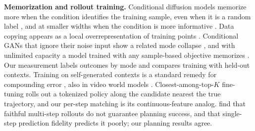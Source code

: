 \textbf{Memorization and rollout training.} Conditional diffusion models memorize more when the condition identifies the training sample, even when it is a random label \citep{gu2025memorization}, and at smaller widths when the condition is more informative \citep{kim2026memorization}. Data copying appears as a local overrepresentation of training points \citep{meehan2020nonparametric,somepalli2023diffusion,carlini2023extracting}. Conditional GANs that ignore their noise input show a related mode collapse \citep{yang2019dsgan,mao2019msgan}, and with unlimited capacity a model trained with any sample-based objective memorizes \citep{li2018imle}. Our measurement labels outcomes by mode and compares training with held-out contexts. Training on self-generated contexts is a standard remedy for compounding error \citep{ross2011dagger,venkatraman2015dad,bengio2015scheduled,lamb2016professor,hafner2019planet}, also in video world models \citep{huang2025selfforcing,gao2026sword}. Closest-among-top-$K$ fine-tuning \citep{zhang2025catk} rolls out a tokenized policy along the candidate nearest the true trajectory, and our per-step matching is its continuous-feature analog. \citet{terver2025drives} find that faithful multi-step rollouts do not guarantee planning success, and \citet{cheung2026fidelity} that single-step prediction fidelity predicts it poorly; our planning results agree.
